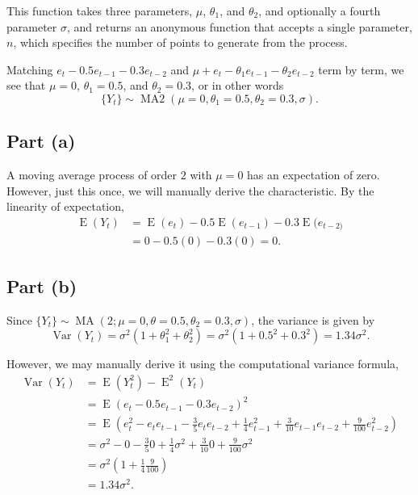 \documentclass[
]{article}
\begin{document}
This function takes three parameters, \(\mu\), \(\theta_1\), and
\(\theta_2\), and optionally a fourth parameter \(\sigma\), and returns
an anonymous function that accepts a single parameter, \(n\), which
specifies the number of points to generate from the process.

Matching \(e_t − 0.5 e_{t−1} − 0.3 e_{t−2}\) and
\(\mu + e_t - \theta_1 e_{t-1} - \theta_2 e_{t-2}\) term by term, we see
that \(\mu = 0\), \(\theta_1 = 0.5\), and \(\theta_2 = 0.3\), or in
other words \[
   \{Y_t\} \sim \operatorname{MA2}(\mu=0,\theta_1=0.5,\theta_2=0.3,\sigma).
\]

\hypertarget{part-a}{%
\subsection{Part (a)}\label{part-a}}


A moving average process of order \(2\) with \(\mu = 0\) has an
expectation of zero. However, just this once, we will manually derive
the characteristic. By the linearity of expectation, \begin{align}
   \operatorname{E}(Y_t)
      &= \operatorname{E}(e_t) - 0.5 \operatorname{E}(e_{t-1}) - 0.3 \operatorname{E}(e_{t-2)}\\
      &= 0 - 0.5 (0) - 0.3 (0) = 0.
\end{align}

\hypertarget{part-b}{%
\subsection{Part (b)}\label{part-b}}


Since
\(\{Y_t\} \sim \operatorname{MA}(2 ; \mu=0, \theta=0.5, \theta_2 = 0.3, \sigma)\),
the variance is given by \[
   \operatorname{Var}(Y_t) = \sigma^2(1 + \theta_1^2 + \theta_2^2) = \sigma^2(1 + 0.5^2 + 0.3^2) = 1.34 \sigma^2.
\]

However, we may manually derive it using the computational variance
formula, \begin{align*}
   \operatorname{Var}(Y_t) &= \operatorname{E}(Y_t^2) - \operatorname{E}^2(Y_t)\\
             &= \operatorname{E}(e_t − 0.5 e_{t−1} − 0.3 e_{t−2})^2\\
             &= \operatorname{E}\!\left(e_t^2 − e_t e_{t−1} − \frac{3}{5} e_t e_{t−2} + \frac{1}{4} e_{t-1}^2 + \frac{3}{10} e_{t-1} e_{t-2} + \frac{9}{100} e_{t-2}^2\right)\\
             &= \sigma^2 - 0 - \frac{3}{5} 0 + \frac{1}{4} \sigma^2 + \frac{3}{10} 0 + \frac{9}{100}\sigma^2\\
             &= \sigma^2 \left(1 + \frac{1}{4} \frac{9}{100}\right)\\
             &= 1.34 \sigma^2.
\end{align*}
\end{document}
